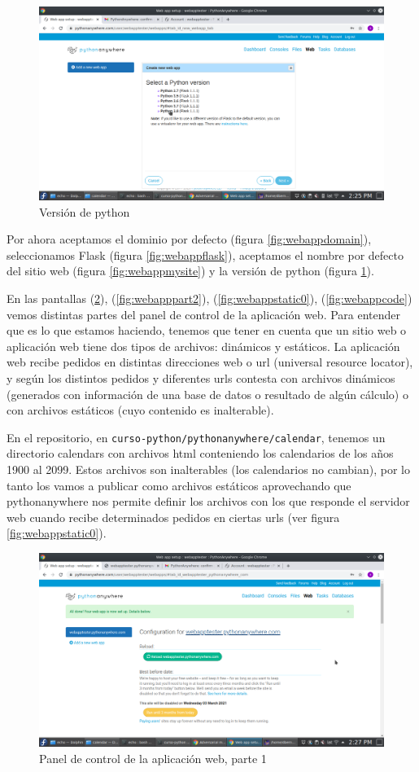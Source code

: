 \documentclass[10pt,a4paper]{article}
\begin{document}
\begin{figure}
	\centering
	\includegraphics[width=0.7\linewidth]{sc/webapp_python_3_8}
	\caption{Versión de python}
	\label{fig:webapppython38}
\end{figure}

Por ahora aceptamos el dominio por defecto (figura \ref{fig:webappdomain}), seleccionamos Flask (figura \ref{fig:webappflask}), aceptamos el nombre por defecto del sitio web (figura \ref{fig:webappmysite}) y la versión de python (figura \ref{fig:webapppython38}).


En las pantallas (\ref{fig:webapppart1}), (\ref{fig:webapppart2}), (\ref{fig:webappstatic0}), (\ref{fig:webappcode}) vemos distintas partes del panel de control de la aplicación web. Para entender que es lo que estamos haciendo, tenemos que tener en cuenta que un sitio web o aplicación web tiene dos tipos de archivos: dinámicos y estáticos. La aplicación web recibe pedidos en distintas direcciones web o url (universal resource locator), y según los distintos pedidos y 
diferentes urls contesta con archivos dinámicos (generados con información de una base de datos o resultado de algún cálculo) o con archivos estáticos (cuyo contenido es inalterable). 

En el repositorio, en \verb|curso-python/pythonanywhere/calendar|, tenemos un directorio calendars con archivos html conteniendo los calendarios de los años 1900 al 2099. Estos
archivos son inalterables (los calendarios no cambian), por lo tanto los vamos a publicar como archivos estáticos aprovechando que pythonanywhere nos permite definir los archivos con los que responde el servidor web cuando recibe determinados pedidos en ciertas urls (ver figura \ref{fig:webappstatic0}).

\begin{figure}
	\centering
	\includegraphics[width=0.7\linewidth]{sc/webapp_part_1}
	\caption{Panel de control de la aplicación web, parte 1}
	\label{fig:webapppart1}
\end{figure}
\end{document}
